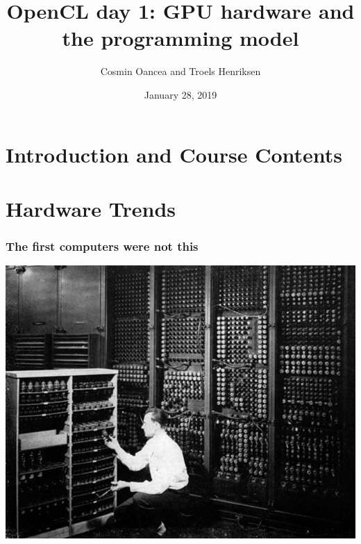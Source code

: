\documentclass{beamer}
\title{OpenCL day 1: GPU hardware and the programming model}
\author{Cosmin Oancea and Troels Henriksen}
\date{January 28, 2019}
\begin{document}
\frame{\titlepage}

\section{Introduction and Course Contents}

\begin{frame}
  \tableofcontents[currentsection]
\end{frame}

\section{Hardware Trends}

\begin{frame}
	\tableofcontents[currentsection]
\end{frame}


\begin{frame}
  \frametitle{The first computers were not this}

  \begin{center}
    \includegraphics[width=\textwidth]{img/eniac.jpg}
  \end{center}

\end{frame}
\end{document}
